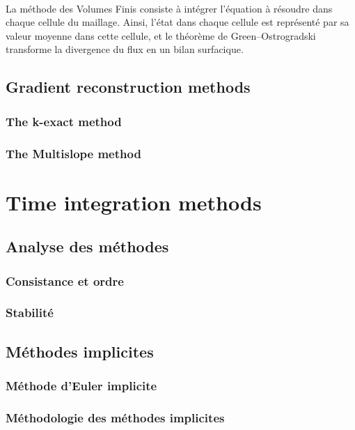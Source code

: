       \paragraph{}
      La méthode des Volumes Finis consiste à intégrer l'équation à résoudre dans chaque cellule du maillage.
      Ainsi, l'état dans chaque cellule est représenté par sa valeur moyenne dans cette cellule, et le théorème de Green--Ostrogradski transforme la divergence du flux en un bilan surfacique.







    \subsection{Gradient reconstruction methods}
      \subsubsection{The k-exact method}
      \subsubsection{The Multislope method}


  \section{Time integration methods}
    \subsection{Analyse des méthodes}
      \subsubsection{Consistance et ordre}
      \subsubsection{Stabilité}
    \subsection{Méthodes implicites}
      \subsubsection{Méthode d'Euler implicite}
      \subsubsection{Méthodologie des méthodes implicites}
